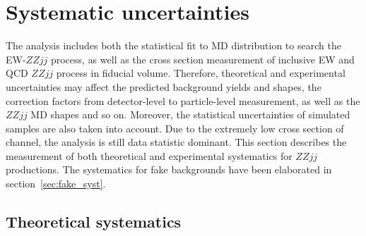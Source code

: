 \section{Systematic uncertainties}
\label{sec:systematics}

The analysis includes both the statistical fit to MD distribution to search the EW-$ZZjj$ process,
as well as the cross section measurement of inclusive EW and QCD $ZZjj$ process in fiducial volume.
Therefore, theoretical and experimental uncertainties may affect the predicted background yields and shapes, 
the correction factors from detector-level to particle-level measurement, as well as the $ZZjj$ MD shapes and so on.
Moreover, the statistical uncertainties of simulated samples are also taken into account.
Due to the extremely low cross section of \llll channel, the analysis is still data statistic dominant.
This section describes the measurement of both theoretical and experimental systematics for $ZZjj$ productions.
The systematics for fake backgrounds have been elaborated in section~\ref{sec:fake_syst}.

\subsection{Theoretical systematics}

